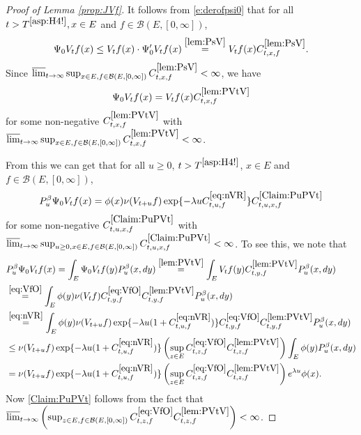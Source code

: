 \documentclass[12pt,a4paper]{amsart}
\numberwithin{equation}{section}
\theoremstyle{plain}
\theoremstyle{definition}
\theoremstyle{remark}
\begin{document}
\begin{proof}[Proof of Lemma \ref{prop:JVf}]
	It follows from \eqref{e:derofpsi0} that for all $t> T^{\eqref{asp:H4!}}, x\in E$ and $f\in \mathcal B(E,[0,\infty])$,
\begin{equation}
	\Psi_0 V_t f (x)
	\leq V_tf(x)\cdot \Psi_0' V_t f(x) \overset{\eqref{lem:PsV}}= V_tf(x) C^{\eqref{lem:PsV}}_{t,x,f}.
\end{equation}
	Since $\varlimsup_{t\to \infty} \sup_{x\in E, f\in \mathcal B(E,[0,\infty])} C^{\eqref{lem:PsV}}_{t,x,f} <\infty$, we have
\begin{equation} \label{lem:PVtV}
	\Psi_0 V_t f(x) = V_tf(x) C^{\eqref{lem:PVtV}}_{t,x,f}
\end{equation}
	for some non-negative $C^{\eqref{lem:PVtV}}_{t,x,f}$ with $\varlimsup_{t\to \infty} \sup_{x\in E, f\in \mathcal B(E,[0,\infty])}
	C^{\eqref{lem:PVtV}}_{t,x,f} < \infty$.
	
	From this we can get that for all $u\geq 0$, $t>T^{\eqref{asp:H4!}}$, $x\in E$ and $f\in \mathcal B(E,[0,\infty])$,
\begin{equation} \label{Claim:PuPVt}
	P_u^\beta \Psi_0 V_{t} f(x) = \phi(x)\nu(V_{t+u}f) \exp\{-\lambda u C^{\eqref{eq:nVR}}_{t,u,f} \} C^{\eqref{Claim:PuPVt}}_{t,u,x,f}
\end{equation}
	for some non-negative $C^{\eqref{Claim:PuPVt}}_{t,u,x,f}$ with
	$\varlimsup_{t\to \infty}
	\sup_{u\geq 0, x\in E, f\in \mathcal B(E,[0,\infty])}
	C^{\eqref{Claim:PuPVt}}_{t,u,x,f} < \infty$.
	To see this, we note that
\begin{align}
	&P_u^\beta \Psi_0 V_{t} f(x)
	= \int_{E} \Psi_0V_tf(y) P_u^\beta (x,dy)
	\overset{\eqref{lem:PVtV}}=\int_{E} V_tf(y)C^{\eqref{lem:PVtV}}_{t,y,f} P_u^\beta (x,dy)
	\\&\overset{\eqref{eq:VfO}}=\int_{E} \phi(y)\nu(V_tf)C^{\eqref{eq:VfO}}_{t,y,f}C^{\eqref{lem:PVtV}}_{t,y,f} P_u^\beta (x,dy)
	\\&\overset{\eqref{eq:nVR}}=\int_{E} \phi(y)\nu(V_{t+u}f) \exp\{-\lambda u (1+C^{\eqref{eq:nVR}}_{t,u,f}) \} C^{\eqref{eq:VfO}}_{t,y,f}C^{\eqref{lem:PVtV}}_{t,y,f} P_u^\beta (x,dy)
	\\& \leq \nu(V_{t+u}f) \exp\{-\lambda u (1+C^{\eqref{eq:nVR}}_{t,u,f}) \} \left(\sup_{z\in E} C^{\eqref{eq:VfO}}_{t,z,f}C^{\eqref{lem:PVtV}}_{t,z,f}\right) \int_{E} \phi(y) P_u^\beta (x,dy)
	\\& = \nu(V_{t+u}f) \exp\{-\lambda u (1+C^{\eqref{eq:nVR}}_{t,u,f}) \} \left(\sup_{z\in E} C^{\eqref{eq:VfO}}_{t,z,f}C^{\eqref{lem:PVtV}}_{t,z,f}\right) e^{\lambda u}\phi(x).
\end{align}
    Now \eqref{Claim:PuPVt} follows from the fact that
	$\varlimsup_{t\to \infty} \left(
	\sup_{z\in E, f\in \mathcal B(E,[0,\infty])} C^{\eqref{eq:VfO}}_{t,z,f}
	C^{\eqref{lem:PVtV}}_{t,z,f}\right) < \infty$.
	

\end{proof}
\end{document}
